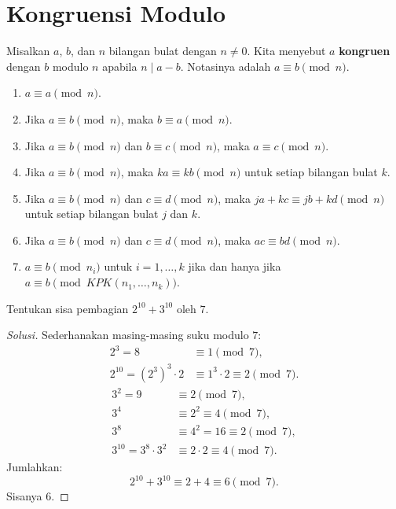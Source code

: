 \documentclass[12pt]{scrartcl}
\begin{document}
\section{Kongruensi Modulo}

\begin{definition}
Misalkan $a$, $b$, dan $n$ bilangan bulat dengan $n \ne 0$.
Kita menyebut $a$ \textbf{kongruen} dengan $b$ modulo $n$ apabila $n \mid a - b$.
Notasinya adalah $a \equiv b \pmod{n}$.
\end{definition}

\begin{fact}
\begin{enumerate}
    \item $a \equiv a \pmod{n}$.
    \item Jika $a \equiv b \pmod{n}$, maka $b \equiv a \pmod{n}$.
    \item Jika $a \equiv b \pmod{n}$ dan $b \equiv c \pmod{n}$, maka $a \equiv c \pmod{n}$.
    \item Jika $a \equiv b \pmod{n}$, maka $ka \equiv kb \pmod{n}$ untuk setiap bilangan bulat $k$.
    \item Jika $a \equiv b \pmod{n}$ dan $c \equiv d \pmod{n}$, maka
    $ja + kc \equiv jb + kd \pmod{n}$ untuk setiap bilangan bulat $j$ dan $k$.
    \item Jika $a \equiv b \pmod{n}$ dan $c \equiv d \pmod{n}$, maka $ac \equiv bd \pmod{n}$.
    \item $a \equiv b \pmod{n_i}$ untuk $i = 1, \dots, k$ jika dan hanya jika
    $a \equiv b \pmod{KPK(n_1, \dots, n_k)}$.
\end{enumerate}
\end{fact}

\begin{example}
Tentukan sisa pembagian $2^{10} + 3^{10}$ oleh $7$.
\end{example}
\begin{proof}[Solusi]
Sederhanakan masing-masing suku modulo $7$:
\begin{align*}
2^3 = 8 &\equiv 1 \pmod{7}, \\
2^{10} = (2^3)^3 \cdot 2 &\equiv 1^3 \cdot 2 \equiv 2 \pmod{7}.
\end{align*}
\begin{align*}
3^2 = 9 &\equiv 2 \pmod{7}, \\
3^4 &\equiv 2^2 \equiv 4 \pmod{7}, \\
3^8 &\equiv 4^2 = 16 \equiv 2 \pmod{7}, \\
3^{10} = 3^8 \cdot 3^2 &\equiv 2 \cdot 2 \equiv 4 \pmod{7}.
\end{align*}
Jumlahkan:
\[ 2^{10} + 3^{10} \equiv 2 + 4 \equiv 6 \pmod{7}. \]
Sisanya $6$.
\end{proof}
\end{document}
